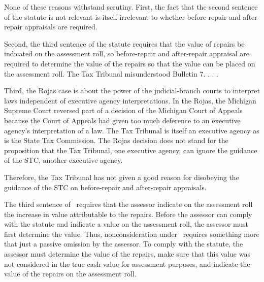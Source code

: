 None of these reasons withstand scrutiny. First, the fact that the second sentence of the statute is not relevant is itself irrelevant to whether before-repair and after-repair appraisals are required. 

Second, the third sentence of the statute requires that the value of repairs be indicated on the assessment roll, so before-repair and after-repair appraisal are required to determine the value of the repairs so that the value can be placed on the assessment roll. The Tax Tribunal misunderstood Bulletin 7. . . . 

Third, the Rojas case is about the power of the judicial-branch courts to interpret laws independent of executive agency interpretations. In the Rojas, the Michigan Supreme Court reversed part of a decision of the Michigan Court of Appeals because the Court of Appeals had given too much deference to an executive agency's interpretation of a law. The Tax Tribunal is itself an executive agency as is the State Tax Commission. The Rojas decision does not stand for the proposition that the Tax Tribunal, one executive agency, can ignore the guidance of the STC, another executive agency. 

Therefore, the Tax Tribunal has not given a good reason for disobeying the guidance of the STC on before-repair and after-repair appraisals.





The third sentence of \mathieuGast\ requires that the assessor indicate on the assessment roll the increase in value attributable to the repairs. Before the assessor can comply with the statute and indicate a value on the assessment roll, the assessor must first determine the value.
Thus, nonconsideration under \mathieuGast\ requires something more that just a passive omission by the assessor. To comply with the statute, the assessor must determine the value of the repairs, make sure that this value was not considered in the true cash value for assessment purposes, and indicate the value of the repairs on the assessment roll.




